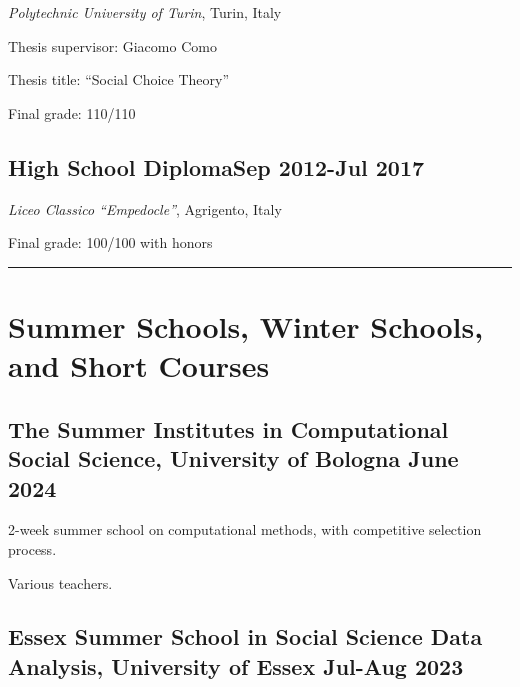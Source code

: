 \documentclass[10pt,]{article}
\providecommand{\tightlist}{%
  \setlength{\itemsep}{0pt}\setlength{\parskip}{0pt}}
\renewenvironment{itemize}{
  \begin{list}{}{
    \setlength{\leftmargin}{1.5em}
  }
}{
  \end{list}
}
\begin{document}
\begin{itemize}
\tightlist
\item
  \emph{Polytechnic University of Turin}, Turin, Italy
\item
  Thesis supervisor: Giacomo Como
\item
  Thesis title: ``Social Choice Theory''
\item
  Final grade: 110/110
\end{itemize}

\subsection{\texorpdfstring{High School Diploma\hfill Sep 2012-Jul
2017}{High School DiplomaSep 2012-Jul 2017}}\label{high-school-diplomasep-2012-jul-2017}

\begin{itemize}
\tightlist
\item
  \emph{Liceo Classico ``Empedocle''}, Agrigento, Italy
\item
  Final grade: 100/100 with honors
\end{itemize}

\bigskip \hrule

\section{Summer Schools, Winter Schools, and Short
Courses}\label{summer-schools-winter-schools-and-short-courses}

\subsection{\texorpdfstring{The Summer Institutes in Computational
Social Science, University of Bologna \hfill  June
2024}{The Summer Institutes in Computational Social Science, University of Bologna June 2024}}\label{the-summer-institutes-in-computational-social-science-university-of-bologna-june-2024}

\begin{itemize}
\tightlist
\item
  2-week summer school on computational methods, with competitive
  selection process.
\item
  Various teachers.
\end{itemize}

\subsection{\texorpdfstring{Essex Summer School in Social Science Data
Analysis, University of Essex \hfill  Jul-Aug
2023}{Essex Summer School in Social Science Data Analysis, University of Essex Jul-Aug 2023}}\label{essex-summer-school-in-social-science-data-analysis-university-of-essex-jul-aug-2023}
\end{document}
